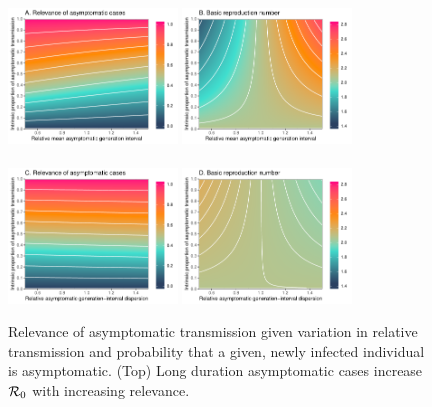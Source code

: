 \begin{figure}[b!]
\begin{center}
\includegraphics[width=0.4\textwidth]{figheatmap.pdf}
\mbox{\hspace{0.05\textwidth}}
\includegraphics[width=0.4\textwidth]{figheatmap_R0.pdf}\\
\mbox{}\\
\includegraphics[width=0.4\textwidth]{figheatmap_kappa.pdf}
\mbox{\hspace{0.05\textwidth}}
\includegraphics[width=0.4\textwidth]{figheatmap_kappa_R0.pdf}
\caption{Relevance of asymptomatic transmission given variation in
relative transmission and probability that a given, newly infected individual is asymptomatic.  (Top) Long duration asymptomatic cases increase ${\cal{R}}_0$ with increasing relevance.
}
\end{center}
\end{figure}
